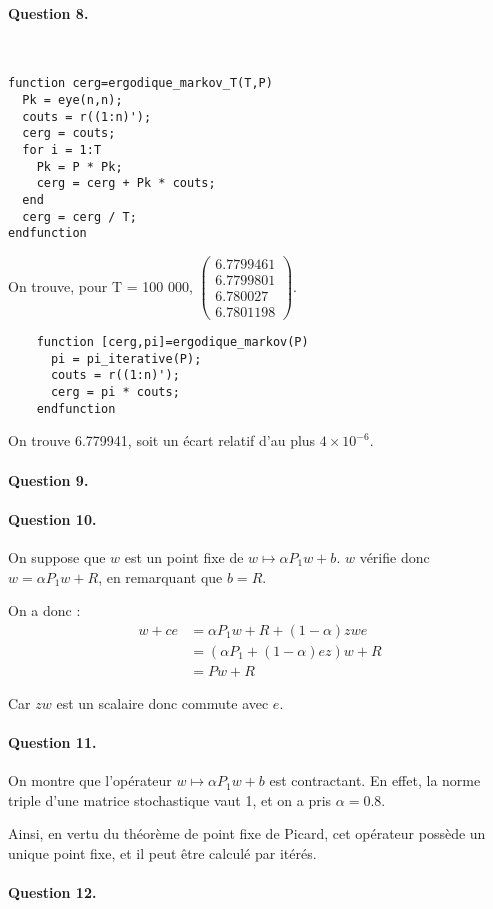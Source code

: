 \documentclass[12pt,a4paper]{article}
\begin{document}
\paragraph*{Question 8.}
~
\begin{lstlisting}
function cerg=ergodique_markov_T(T,P)
  Pk = eye(n,n);
  couts = r((1:n)');
  cerg = couts;
  for i = 1:T
    Pk = P * Pk;
    cerg = cerg + Pk * couts;
  end
  cerg = cerg / T;
endfunction
\end{lstlisting}

On trouve, pour T = 100 000, $\begin{pmatrix} 6.7799461 \\ 6.7799801 \\ 6.780027 \\ 6.7801198 \end{pmatrix}$.

\begin{lstlisting}
    function [cerg,pi]=ergodique_markov(P)
      pi = pi_iterative(P);
      couts = r((1:n)');
      cerg = pi * couts;
    endfunction
\end{lstlisting}

On trouve 6.779941, soit un écart relatif d'au plus $4 \times 10^{-6}$.

\paragraph*{Question 9.}

\paragraph*{Question 10.}
On suppose que $w$ est un point fixe de $w \mapsto \alpha P_1 w + b$. $w$ vérifie donc $w = \alpha P_1 w + R$, en remarquant que $b = R$.

On a donc :
\begin{align*}
    w + c e &= \alpha P_1 w + R + (1 - \alpha) z w e\\
    &= (\alpha P_1 + (1 - \alpha) e z)w + R \\
    &= P w + R
\end{align*}

Car $zw$ est un scalaire donc commute avec $e$.

\paragraph*{Question 11.}
On montre que l'opérateur $w \mapsto \alpha P_1 w + b$ est contractant. En effet, la norme triple d'une matrice stochastique vaut 1, et on a pris $\alpha = 0.8$.

Ainsi, en vertu du théorème de point fixe de Picard, cet opérateur possède un unique point fixe, et il peut être calculé par itérés.

\paragraph*{Question 12.}
\end{document}

